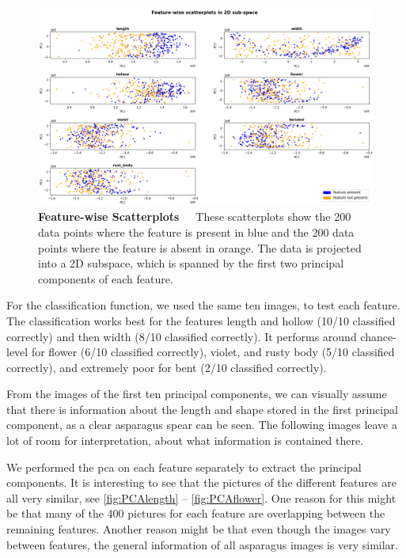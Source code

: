 \begin{figure}[h]
	\centering
	\includegraphics[scale=0.35]{Figures/chapter04/pca_scatterplot.png}
	\decoRule
	\caption[Feature-Wise Scatterplots]{\textbf{Feature-wise Scatterplots}~~~These scatterplots show the 200 data points where the feature is present in blue and the 200 data points where the feature is absent in orange. The data is projected into a 2D subspace, which is spanned by the first two principal components of each feature.}
	\label{fig:PCAscatter}
\end{figure}

For the classification function, we used the same ten images, to test each feature. The classification works best for the features length and hollow (10/10 classified correctly) and then width (8/10 classified correctly). It performs around chance-level for flower (6/10 classified correctly), violet, and rusty body (5/10 classified correctly), and extremely poor for bent (2/10 classified correctly).   

From the images of the first ten principal components, we can visually assume that there is information about the length and shape stored in the first principal component, as a clear asparagus spear can be seen. The following images leave a lot of room for interpretation, about what information is contained there.

We performed the \acrshort{pca} on each feature separately to extract the principal components. It is interesting to see that the pictures of the different features are all very similar, see \autoref{fig:PCAlength} -- \autoref{fig:PCAflower}. One reason for this might be that many of the 400 pictures for each feature are overlapping between the remaining features. Another reason might be that even though the images vary between features, the general information of all asparagus images is very similar.

